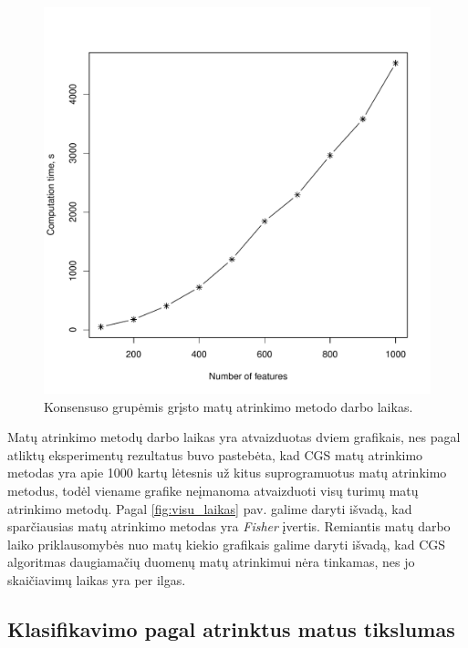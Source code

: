 \begin{figure}[ht]
\begin{minipage}[b]{0.5\linewidth}
\includegraphics[width=1\textwidth]{images/cgs_performance.pdf}
 \caption{Konsensuso grupėmis grįsto matų atrinkimo metodo darbo laikas.}
 \label{fig:cgs_laikas}
\end{minipage}
\end{figure}

Matų atrinkimo metodų darbo laikas yra atvaizduotas dviem grafikais, nes pagal atliktų eksperimentų rezultatus buvo pastebėta, kad CGS matų atrinkimo metodas yra apie 1000 kartų lėtesnis už kitus suprogramuotus matų atrinkimo metodus, todėl viename grafike neįmanoma atvaizduoti visų turimų matų atrinkimo metodų. Pagal \ref{fig:visu_laikas} pav. galime daryti išvadą, kad sparčiausias matų atrinkimo metodas yra \textit{Fisher} įvertis. Remiantis matų darbo laiko priklausomybės nuo matų kiekio grafikais galime daryti išvadą, kad CGS algoritmas daugiamačių duomenų matų atrinkimui nėra tinkamas, nes jo skaičiavimų laikas yra per ilgas.

\subsection{Klasifikavimo pagal atrinktus matus tikslumas}

